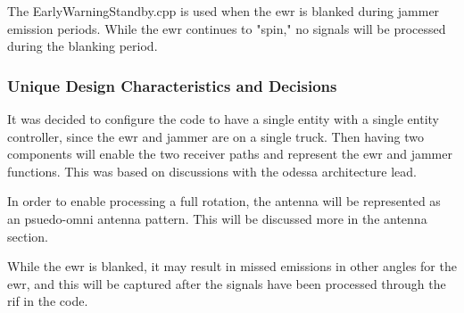 \unclass The EarlyWarningStandby.cpp is used when the \gls{ewr} is blanked during jammer emission periods. While the \gls{ewr} continues to "spin," no signals will be processed during the blanking period.


\subsubsection{\unclass \componentname Unique Design Characteristics and Decisions}
\unclass It was decided to configure the code to have a single entity with a single entity controller, since the \gls{ewr} and jammer are on a single truck. Then having two components will enable the two receiver paths and represent the \gls{ewr} and jammer functions. This was based on discussions with the \gls{odessa} architecture lead.

\unclass In order to enable processing a full rotation, the antenna will be represented as an psuedo-omni antenna pattern. This will be discussed more in the antenna section.

\unclass While the \gls{ewr} is blanked, it may result in missed emissions in other angles for the \gls{ewr}, and this will be captured after the signals have been processed through the \gls{rif} in the code.


